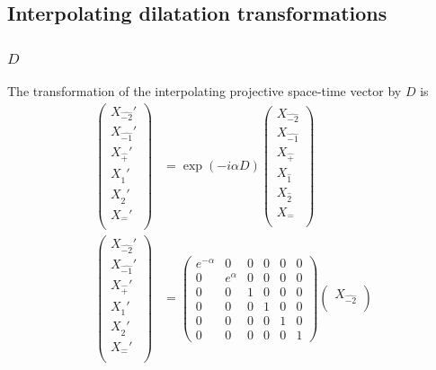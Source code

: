 \documentclass[foundations,article,submit,pdftex,moreauthors]{Definitions/mdpi}
\begin{document}
\subsection{Interpolating dilatation transformations}
\subsubsection{\texorpdfstring{$D$}{D}}
The transformation of the interpolating projective
space-time vector by $D$ is
\begin{align}
\begin{pmatrix}
    {X}_{\hat{-2}}'\\
    {X}_{\hat{-1}}'\\
    {X}_{\hat{+}}'\\
    {X}_{\hat{1}}'\\
    {X}_{\hat{2}}'\\
    {X}_{\hat{-}}'\\
    \end{pmatrix}&= \exp{(-i\alpha D)}\begin{pmatrix}
    {X}_{\hat{-2}}\\
    {X}_{\hat{-1}}\\
    {X}_{\hat{+}}\\
    {X}_{\hat{1}}\\
    {X}_{\hat{2}}\\
    {X}_{\hat{-}}\\
    \end{pmatrix}\\
    \begin{pmatrix}
    {X}_{\hat{-2}}'\\
    {X}_{\hat{-1}}'\\
    {X}_{\hat{+}}'\\
    {X}_{\hat{1}}'\\
    {X}_{\hat{2}}'\\
    {X}_{\hat{-}}'\\
    \end{pmatrix}&= \begin{pmatrix}
        e^{-\alpha}&0&0&0&0&0\\
        0&e^{\alpha}&0&0&0&0\\
        0&0&1&0&0&0\\
        0&0&0&1&0&0\\
        0&0&0&0&1&0\\
        0&0&0&0&0&1
    \end{pmatrix}\begin{pmatrix}
    {X}_{\hat{-2}}\\

\end{pmatrix}
\end{align}
\end{document}
